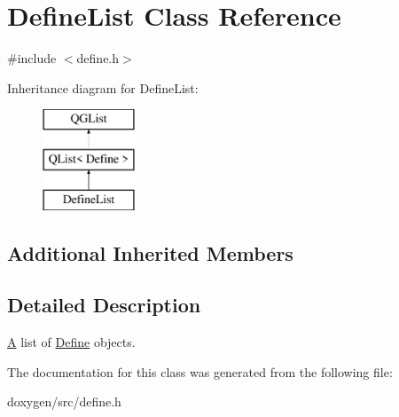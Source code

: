 \hypertarget{class_define_list}{}\section{Define\+List Class Reference}
\label{class_define_list}


{\ttfamily \#include $<$define.\+h$>$}

Inheritance diagram for Define\+List\+:\begin{figure}[H]
\begin{center}
\leavevmode
\includegraphics[height=3.000000cm]{class_define_list}
\end{center}
\end{figure}
\subsection*{Additional Inherited Members}


\subsection{Detailed Description}
\mbox{\hyperlink{class_a}{A}} list of \mbox{\hyperlink{class_define}{Define}} objects. 

The documentation for this class was generated from the following file\+:\begin{DoxyCompactItemize}
\item 
doxygen/src/define.\+h\end{DoxyCompactItemize}
